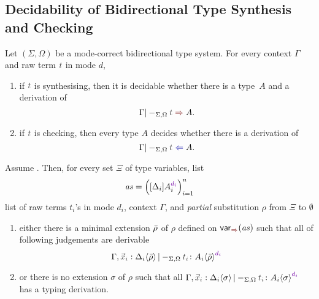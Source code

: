 \subsection{Decidability of Bidirectional Type Synthesis and Checking}


\begin{theorem} \label{thm:bidirectional-type-synthesis-checking}
  Let $(\Sigma, \Omega)$ be a mode-correct bidirectional type system.
  For every context $\Gamma$ and raw term $\isTerm{t}$ in mode $d$, 
  \begin{enumerate}
    \item if $\isTerm{t}$ is synthesising, then it is decidable whether there is a type~$A$ and a derivation of
      \[
        \Gamma |-_{\Sigma, \Omega} \isTerm{t} \syn A.
      \]
    \item if $\isTerm{t}$ is checking, then every type $A$ decides whether there is a derivation of
      \[
        \Gamma |-_{\Sigma, \Omega} \isTerm{t} \chk A.
      \]
  \end{enumerate}
\end{theorem}
\begin{lemma}\label{lem:args-induction}
  Assume .
  Then, for every set $\Xi$ of type variables, list 
  \[
    \mathit{as} = \left([\Delta_i] A_{i}^{\dir{d_i}}\right)_{i = 1}^{n}
  \]
  list of raw terms $t_i$'s in mode $d_i$, context $\Gamma$, and \emph{partial} substitution $\rho$ from $\Xi$ to $\emptyset$
  \begin{enumerate}
    \item either there is a minimal extension $\bar{\rho}$ of $\rho$ defined on $\synvar(\mathit{as})$ such that all of following judgements are derivable
      \[
        \Gamma, \vars{x}_\isTerm{i} : \simsub{\Delta_i}{\ext{\rho}} |-_{\Sigma, \Omega} \isTerm{t_i} \colon \simsub{A_i}{\ext{\rho}}^{\dir{d_i}}
      \]

    \item or there is no extension $\sigma$ of $\rho$ such that all $\Gamma, \vars{x}_\isTerm{i} : \simsub{\Delta_i}{\sigma} |-_{\Sigma, \Omega} \isTerm{t_i} \colon \simsub{A_i}{\sigma}^{\dir{d_i}}$ has a typing derivation. 
  \end{enumerate}
\end{lemma}

